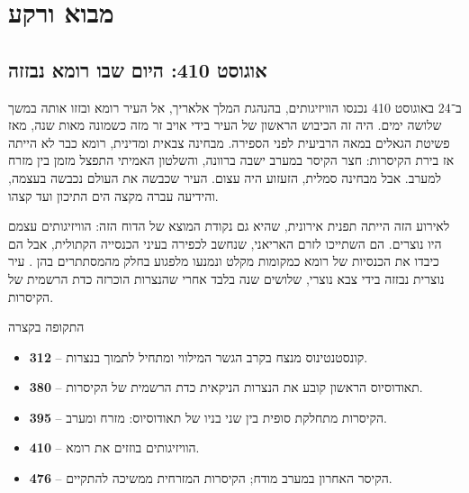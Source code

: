 
\chapter{מבוא ורקע}
\label{ch:intro}

\section{אוגוסט 410: היום שבו רומא נבזזה}
\label{sec:intro-410}

ב־24 באוגוסט 410 נכנסו הוויזיגותים, בהנהגת המלך אלאריך, אל העיר רומא ובזזו אותה במשך שלושה ימים. היה זה הכיבוש הראשון של העיר בידי אויב זר מזה כשמונה מאות שנה, מאז פשיטת הגאלים במאה הרביעית לפני הספירה. מבחינה צבאית ומדינית, רומא כבר לא הייתה אז בירת הקיסרות: חצר הקיסר במערב ישבה ברוונה, והשלטון האמיתי התפצל מזמן בין מזרח למערב. אבל מבחינה סמלית, הזעזוע היה עצום. העיר שכבשה את העולם נכבשה בעצמה, והידיעה עברה מקצה הים התיכון ועד קצהו.

לאירוע הזה הייתה תפנית אירונית, שהיא גם נקודת המוצא של הדוח הזה: הוויזיגותים עצמם היו נוצרים. הם השתייכו לזרם האריאני, שנחשב לכפירה בעיני הכנסייה הקתולית, אבל הם כיבדו את הכנסיות של רומא כמקומות מקלט ונמנעו מלפגוע בחלק מהמסתתרים בהן \cite{augustine_citygod}. עיר נוצרית נבזזה בידי צבא נוצרי, שלושים שנה בלבד אחרי שהנצרות הוכרזה כדת הרשמית של הקיסרות.

\begin{keybox}{התקופה בקצרה}
\begin{itemize}
  \item \textbf{312} – קונסטנטינוס מנצח בקרב הגשר המילווי ומתחיל לתמוך בנצרות.
  \item \textbf{380} – תאודוסיוס הראשון קובע את הנצרות הניקאית כדת הרשמית של הקיסרות.
  \item \textbf{395} – הקיסרות מתחלקת סופית בין שני בניו של תאודוסיוס: מזרח ומערב.
  \item \textbf{410} – הוויזיגותים בוזזים את רומא.
  \item \textbf{476} – הקיסר האחרון במערב מודח; הקיסרות המזרחית ממשיכה להתקיים.
\end{itemize}
\end{keybox}


